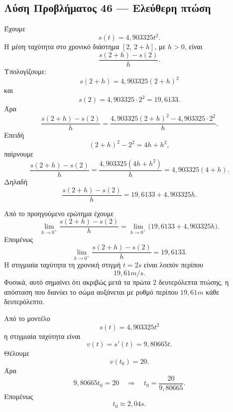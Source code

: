 \subsection*{Λύση Προβλήματος 46 --- Ελεύθερη πτώση}

\begin{alist}
  \item Έχουμε
        \[
          s(t)=4{,}903325t^2.
        \]
        Η μέση ταχύτητα στο χρονικό διάστημα $[2,\,2+h]$, με $h>0$,
        είναι
        \[
          \frac{s(2+h)-s(2)}{h}.
        \]
        Υπολογίζουμε:
        \[
          s(2+h)=4{,}903325(2+h)^2
        \]
        και
        \[
          s(2)=4{,}903325\cdot2^2=19{,}6133.
        \]
        Άρα
        \[
          \frac{s(2+h)-s(2)}{h}
          =
          \frac{4{,}903325(2+h)^2-4{,}903325\cdot2^2}{h}.
        \]
        Επειδή
        \[
          (2+h)^2-2^2=4h+h^2,
        \]
        παίρνουμε
        \[
          \frac{s(2+h)-s(2)}{h}
          =
          \frac{4{,}903325(4h+h^2)}{h}
          =
          4{,}903325(4+h).
        \]
        Δηλαδή
        \[
          {
          \frac{s(2+h)-s(2)}{h}
          =
          19{,}6133+4{,}903325h
          }.
        \]

  \item Από το προηγούμενο ερώτημα έχουμε
        \[
          \lim_{h\to0^+}\frac{s(2+h)-s(2)}{h}
          =
          \lim_{h\to0^+}
          \bigl(19{,}6133+4{,}903325h\bigr).
        \]
        Επομένως
        \[
          {
          \lim_{h\to0^+}\frac{s(2+h)-s(2)}{h}
          =
          19{,}6133
          }.
        \]
        Η στιγμιαία ταχύτητα τη χρονική στιγμή $t=2\si{s}$ είναι λοιπόν
        περίπου
        \[
          {19{,}61\si{m/s}}.
        \]
        Φυσικά, αυτό σημαίνει ότι ακριβώς μετά τα πρώτα $2$ δευτερόλεπτα
        πτώσης, η απόσταση που διανύει το σώμα αυξάνεται με ρυθμό περίπου
        $19{,}61\si{m}$ κάθε δευτερόλεπτο.

  \item Από το μοντέλο
        \[
          s(t)=4{,}903325t^2
        \]
        η στιγμιαία ταχύτητα είναι
        \[
          v(t)=s'(t)=9{,}80665t.
        \]
        Θέλουμε
        \[
          v(t_0)=20.
        \]
        Άρα
        \[
          9{,}80665t_0=20
          \quad\Rightarrow\quad
          t_0=\frac{20}{9{,}80665}.
        \]
        Επομένως
        \[
          {t_0\approx2{,}04\si{s}}.
        \]
\end{alist}
